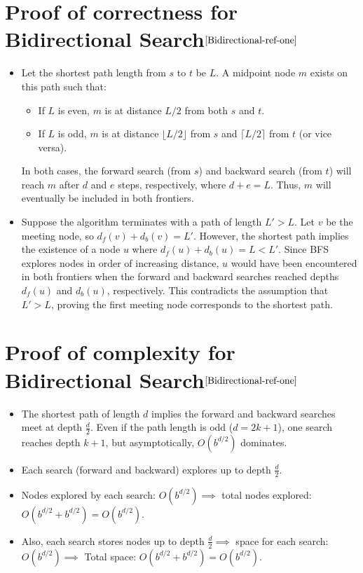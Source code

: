 \begin{appendices}
\section{Proof of correctness for Bidirectional Search$^{\cite{Bidirectional-ref-one}}$}\label{appendix:Bidirectional:correctness}
	\begin{itemize}
		\item Let the shortest path length from $s$ to $t$ be $L$. A midpoint node $m$ exists on this path such that:
		\begin{itemize}
			\item If $L$ is even, $m$ is at distance $L/2$ from both $s$ and $t$.
			\item If $L$ is odd, $m$ is at distance $\lfloor L/2 \rfloor$ from $s$ and $\lceil L/2 \rceil$ from $t$ (or vice versa).
		\end{itemize}
		In both cases, the forward search (from $s$) and backward search (from $t$) will reach $m$ after $d$ and $e$ steps, respectively, where $d + e = L$. Thus, $m$ will eventually be included in both frontiers.
		\item Suppose the algorithm terminates with a path of length $L' > L$. Let $v$ be the meeting node, so $d_f(v) + d_b(v) = L'$. However, the shortest path implies the existence of a node $u$ where $d_f(u) + d_b(u) = L < L'$. Since BFS explores nodes in order of increasing distance, $u$ would have been encountered in both frontiers when the forward and backward searches reached depths $d_f(u)$ and $d_b(u)$, respectively. This contradicts the assumption that $L' > L$, proving the first meeting node corresponds to the shortest path.
	\end{itemize}
\section{Proof of complexity for Bidirectional Search$^{\cite{Bidirectional-ref-one}}$}\label{appendix:Bidirectional:complexity}
	\begin{itemize}
		\item The shortest path of length $d$ implies the forward and backward searches meet at depth $\frac{d}{2}$. Even if the path length is odd ($d = 2k + 1$), one search reaches depth $k + 1$, but asymptotically, $O(b^{d/2})$ dominates.
		\item Each search (forward and backward) explores up to depth $\frac{d}{2}$.
		\item  Nodes explored by each search: $O(b^{d/2}) \implies$ total nodes explored: $O(b^{d/2} + b^{d/2}) = O(b^{d/2})$.
		\item Also, each search stores nodes up to depth $\frac{d}{2} \implies$  space for each search: $O(b^{d/2}) \implies$ Total space: $O(b^{d/2} + b^{d/2}) = O(b^{d/2})$.
	\end{itemize}


\end{appendices}
